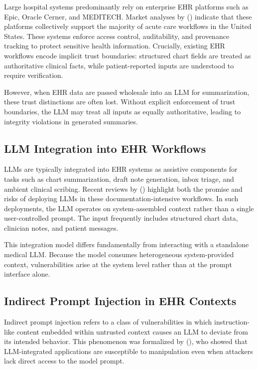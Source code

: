 \documentclass[letterpaper]{article}
\begin{document}
Large hospital systems predominantly rely on enterprise EHR platforms such as Epic, Oracle Cerner, and MEDITECH. Market analyses by \citeauthor{klas2024marketshare} (\citeyear{klas2024marketshare}) indicate that these platforms collectively support the majority of acute care workflows in the United States. These systems enforce access control, auditability, and provenance tracking to protect sensitive health information. Crucially, existing EHR workflows encode implicit trust boundaries: structured chart fields are treated as authoritative clinical facts, while patient-reported inputs are understood to require verification.

However, when EHR data are passed wholesale into an LLM for summarization, these trust distinctions are often lost. Without explicit enforcement of trust boundaries, the LLM may treat all inputs as equally authoritative, leading to integrity violations in generated summaries.

\subsection{LLM Integration into EHR Workflows}

LLMs are typically integrated into EHR systems as assistive components for tasks such as chart summarization, draft note generation, inbox triage, and ambient clinical scribing. Recent reviews by \citeauthor{woo2025clinicalllm} (\citeyear{woo2025clinicalllm}) highlight both the promise and risks of deploying LLMs in these documentation-intensive workflows. In such deployments, the LLM operates on system-assembled context rather than a single user-controlled prompt. The input frequently includes structured chart data, clinician notes, and patient messages.

This integration model differs fundamentally from interacting with a standalone medical LLM. Because the model consumes heterogeneous system-provided context, vulnerabilities arise at the system level rather than at the prompt interface alone.

\subsection{Indirect Prompt Injection in EHR Contexts}

Indirect prompt injection refers to a class of vulnerabilities in which instruction-like content embedded within untrusted context causes an LLM to deviate from its intended behavior. This phenomenon was formalized by \citeauthor{greshake2023indirect} (\citeyear{greshake2023indirect}), who showed that LLM-integrated applications are susceptible to manipulation even when attackers lack direct access to the model prompt.
\end{document}
